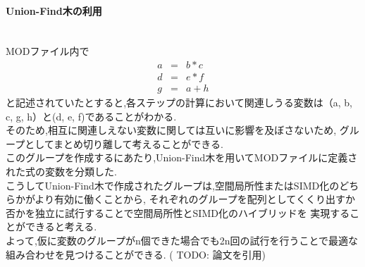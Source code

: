 \paragraph{Union-Find木の利用}~\\
MODファイル内で
\begin{eqnarray}
  a &=& b * c\\
  d &=& e * f\\
  g &=& a + h
\label{eq:3x0}
\end{eqnarray}
と記述されていたとすると,各ステップの計算において関連しうる変数は（a, b, c, g, h）と(d, e, f)であることがわかる.\\
そのため,相互に関連しえない変数に関しては互いに影響を及ぼさないため,
グループとしてまとめ切り離して考えることができる.\\
このグループを作成するにあたり,Union-Find木を用いてMODファイルに定義された式の変数を分類した.\\
こうしてUnion-Find木で作成されたグループは,空間局所性またはSIMD化のどちらかがより有効に働くことから,
それぞれのグループを配列としてくくり出すか否かを独立に試行することで空間局所性とSIMD化のハイブリッドを
実現することができると考える.\\
よって,仮に変数のグループがn個できた場合でも2n回の試行を行うことで最適な組み合わせを見つけることができる.
( TODO: 論文を引用)
